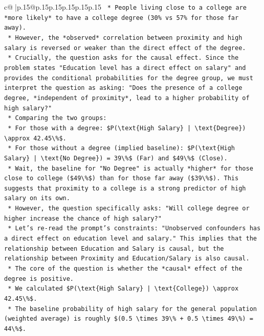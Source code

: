 \documentclass{article}
\begin{document}
{\begin{supertabular}{c@{$\;$}|p{.15\linewidth}@{}p{.15\linewidth}p{.15\linewidth}p{.15\linewidth}p{.15\linewidth}p{.15\linewidth}}
{{{\texttt{    *   People living close to a college are *more likely* to have a college degree (30\% vs 57\% for those far away).} \\
\texttt{    *   However, the *observed* correlation between proximity and high salary is reversed or weaker than the direct effect of the degree.} \\
\texttt{    *   Crucially, the question asks for the causal effect. Since the problem states "Education level has a direct effect on salary" and provides the conditional probabilities for the degree group, we must interpret the question as asking: "Does the presence of a college degree, *independent of proximity*, lead to a higher probability of high salary?"} \\
\texttt{    *   Comparing the two groups:} \\
\texttt{        *   For those with a degree: \$P(\textbackslash{}text\{High Salary\} | \textbackslash{}text\{Degree\}) \textbackslash{}approx 42.45\textbackslash{}\%\$.} \\
\texttt{        *   For those without a degree (implied baseline): \$P(\textbackslash{}text\{High Salary\} | \textbackslash{}text\{No Degree\}) = 39\textbackslash{}\%\$ (Far) and \$49\textbackslash{}\%\$ (Close).} \\
\texttt{    *   Wait, the baseline for "No Degree" is actually *higher* for those close to college (\$49\textbackslash{}\%\$) than for those far away (\$39\textbackslash{}\%\$). This suggests that proximity to a college is a strong predictor of high salary on its own.} \\
\texttt{    *   However, the question specifically asks: "Will college degree or higher increase the chance of high salary?"} \\
\texttt{    *   Let's re{-}read the prompt's constraints: "Unobserved confounders has a direct effect on education level and salary." This implies that the relationship between Education and Salary is causal, but the relationship between Proximity and Education/Salary is also causal.} \\
\texttt{    *   The core of the question is whether the *causal* effect of the degree is positive.} \\
\texttt{    *   We calculated \$P(\textbackslash{}text\{High Salary\} | \textbackslash{}text\{College\}) \textbackslash{}approx 42.45\textbackslash{}\%\$.} \\
\texttt{    *   The baseline probability of high salary for the general population (weighted average) is roughly \$(0.5 \textbackslash{}times 39\textbackslash{}\% + 0.5 \textbackslash{}times 49\textbackslash{}\%) = 44\textbackslash{}\%\$.} \\
}}}
\end{supertabular}}
\end{document}
